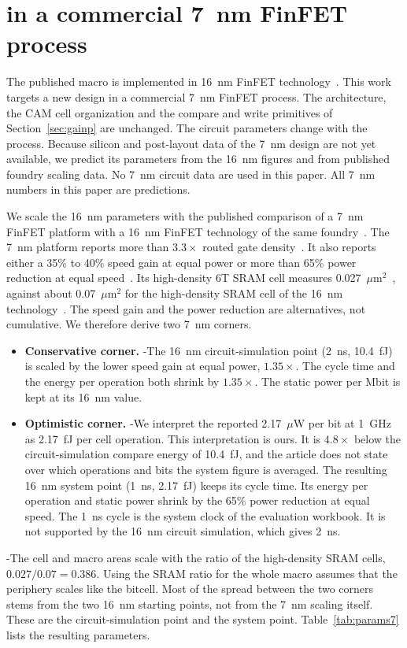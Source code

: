 \section{\gainp{} in a commercial 7~nm FinFET process}\label{sec:gainp7}

The published \gainp{} macro is implemented in 16~nm FinFET technology~\cite{levi2026gainp}.
This work targets a new \gainp{} design in a commercial 7~nm FinFET process.
The architecture, the CAM cell organization and the compare and write primitives of Section~\ref{sec:gainp} are unchanged.
The circuit parameters change with the process.
Because silicon and post-layout data of the 7~nm design are not yet available, we predict its parameters from the 16~nm \gainp{} figures and from published foundry scaling data. No 7~nm circuit data are used in this paper.
All 7~nm numbers in this paper are predictions.

\label{sec:params7}
We scale the 16~nm \gainp{} parameters with the published comparison of a 7~nm FinFET platform with a 16~nm FinFET technology of the same foundry~\cite{wu2016n7,wu2013n16}.
The 7~nm platform reports more than $3.3\times$ routed gate density~\cite{wu2016n7}. It also reports either a 35\% to 40\% speed gain at equal power or more than 65\% power reduction at equal speed~\cite{wu2016n7}.
Its high-density 6T SRAM cell measures 0.027~$\mu$m$^2$~\cite{wu2016n7}, against about 0.07~$\mu$m$^2$ for the high-density SRAM cell of the 16~nm technology~\cite{wu2013n16}.
The speed gain and the power reduction are alternatives, not cumulative. We therefore derive two 7~nm corners.
\begin{itemize}
\item \textbf{Conservative corner.} \hyp{The 16~nm circuit-simulation point (2~ns, 10.4~fJ) is scaled by the lower speed gain at equal power, $1.35\times$. The cycle time and the energy per operation both shrink by $1.35\times$. The static power per Mbit is kept at its 16~nm value.}
\item \textbf{Optimistic corner.} \hyp{We interpret the reported 2.17~$\mu$W per bit at 1~GHz~\cite{levi2026gainp} as 2.17~fJ per cell operation. This interpretation is ours. It is $4.8\times$ below the circuit-simulation compare energy of 10.4~fJ, and the article does not state over which operations and bits the system figure is averaged. The resulting 16~nm system point (1~ns, 2.17~fJ) keeps its cycle time. Its energy per operation and static power shrink by the 65\% power reduction at equal speed. The 1~ns cycle is the system clock of the evaluation workbook. It is not supported by the 16~nm circuit simulation, which gives 2~ns.}
\end{itemize}
\hyp{The cell and macro areas scale with the ratio of the high-density SRAM cells, $0.027/0.07=0.386$.
Using the SRAM ratio for the whole macro assumes that the periphery scales like the bitcell.}
Most of the spread between the two corners stems from the two 16~nm starting points, not from the 7~nm scaling itself. These are the circuit-simulation point and the system point.
Table~\ref{tab:params7} lists the resulting parameters.

